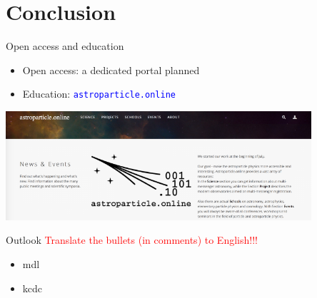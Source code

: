 \section{Conclusion}

\begin{frame}{Open access and education}
    \vspace{-4em}
    \begin{itemize}
        \item Open access: a dedicated portal planned
        \item Education: \textcolor{blue}{\texttt{astroparticle.online}}
    \end{itemize}
    \centering
    \includegraphics[width=0.85\textwidth]{pics/astro_onl.png}
\end{frame}

\begin{frame}{Outlook}
\textcolor{red}{Translate the bullets (in comments) to English!!!}
    \begin{itemize}
    \item mdl
    \item kcdc
    \end{itemize}
\end{frame}

